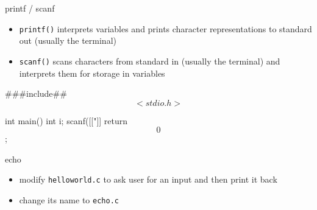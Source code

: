 \documentclass[10pt,t]{beamer}
\begin{document}
  \begin{frame}[fragile]{printf / scanf}
    \begin{itemize}
      \item \texttt{printf()} interprets variables and prints character
        representations to standard out (usually the terminal)
      \item \texttt{scanf()} scans characters from standard in (usually the
        terminal) and interprets them for storage in variables
    \end{itemize}

    \begin{codeblock}
    ###include## $$<stdio.h>$$

    int main() {
      int i;
      scanf([["]]%
      return $$0$$;
    }
    \end{codeblock}

  \end{frame}

  \begin{frame}[fragile]{echo}
    \begin{itemize}
      \item modify \texttt{helloworld.c} to ask user for an input and then print
        it back
      \item change its name to \texttt{echo.c}
    \end{itemize}


  \end{frame}
\end{document}
